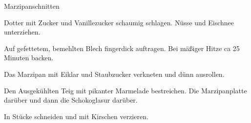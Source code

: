 \begin{recipe}{Marzipanschnitten}

    \begin{ingredients}
    \end{ingredients}

    \begin{instructions}
        Dotter mit Zucker und Vanillezucker schaumig schlagen.
        Nüsse und Eischnee unterziehen.
        
        Auf gefettetem, bemehlten Blech fingerdick auftragen.
        Bei mäßiger Hitze ca 25 Minuten backen.

        Das Marzipan mit Eiklar und Staubzucker verkneten und dünn ausrollen.

        Den Ausgekühlten Teig mit pikanter Marmelade bestreichen.
        Die Marzipanplatte darüber und dann die Schokoglasur darüber.

        In Stücke schneiden und mit Kirschen verzieren.
    \end{instructions}
\end{recipe}
